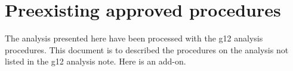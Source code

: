 \documentclass[10pt,a4paper]{report}
\author{Michael C. Kunkel}
\begin{document}
	\section{Preexisting approved procedures}
	The analysis presented here have been processed with the g12 analysis procedures. This document is to described the procedures on the analysis not listed in the g12 analysis note. Here is an add-on.
\end{document}
